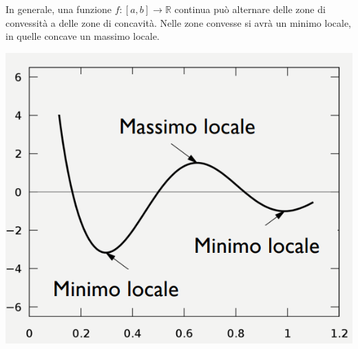\documentclass[12pt]{article}
\begin{document}
In generale, una funzione $f:[a,b] \rightarrow \mathbb{R}$ continua può alternare delle zone di convessità a delle zone di concavità.
Nelle zone convesse si avrà un minimo locale, in quelle concave un massimo locale.
\begin{center}
    \includegraphics[width = 0.45\linewidth]{Images/91.png}
\end{center}
\end{document}
